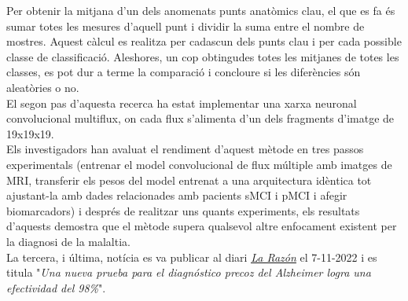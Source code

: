 \documentclass[a4paper,12pt]{report}
\begin{document}
Per obtenir la mitjana d'un dels anomenats punts anatòmics clau, el que es fa és sumar totes les mesures d'aquell punt i dividir la suma entre el nombre de mostres. Aquest càlcul es realitza per cadascun dels punts clau i per cada possible classe de classificació. Aleshores, un cop obtingudes totes les mitjanes de totes les classes, es pot dur a terme la comparació i concloure si les diferències són aleatòries o no.\\
El segon pas d'aquesta recerca ha estat implementar una xarxa neuronal convolucional multiflux, on cada flux s'alimenta d'un dels fragments d'imatge de 19x19x19.\\
Els investigadors han avaluat el rendiment d'aquest mètode en tres passos experimentals (entrenar el model convolucional de flux múltiple amb imatges de MRI, transferir els pesos del model entrenat a una arquitectura idèntica tot ajustant-la amb dades relacionades amb pacients sMCI i pMCI i afegir biomarcadors) i després de realitzar uns quants experiments, els resultats d'aquests demostra que el mètode supera qualsevol altre enfocament existent per la diagnosi de la malaltia.\\
La tercera, i última, notícia es va publicar al diari \href{https://www.larazon.es/sociedad/20220620/ajwe2fywxzgnta7zt4godk4bae.html}{\underline{\textit{La Razón}}} el 7-11-2022 i es titula "\textit{Una nueva prueba para el diagnóstico precoz del Alzheimer logra una efectividad del 98\%}".
\end{document}
